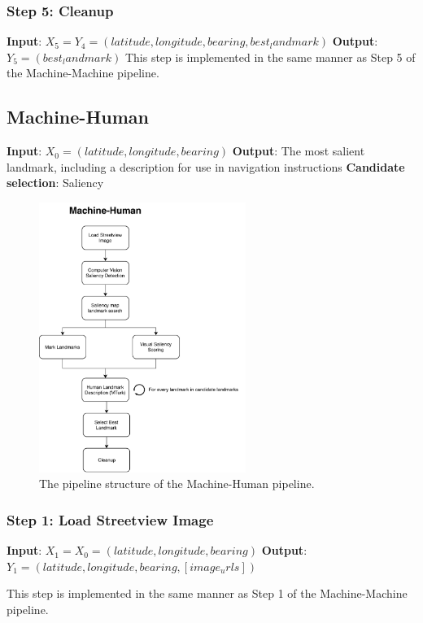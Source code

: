 \subsubsection*{Step 5: Cleanup}

\textbf{Input}: $X_5 = Y_4 = (latitude, longitude, bearing, best_landmark)$
\textbf{Output}: $Y_5 = (best_landmark)$
This step is implemented in the same manner as Step 5 of the Machine-Machine pipeline.

\subsection{Machine-Human}
\textbf{Input}: $X_0 = (latitude, longitude, bearing)$
\textbf{Output}: The most salient landmark, including a description for use in navigation instructions
\textbf{Candidate selection}: Saliency

\begin{figure}[htbp]
  \centering
  \includegraphics[width=0.6\textwidth]{pipeline_diagrams/machine-human.pdf}
  \caption{The pipeline structure of the Machine-Human pipeline.}
  \label{fig:pipeline:mh}
\end{figure}

\subsubsection*{Step 1: Load Streetview Image}
\textbf{Input}: $X_1 = X_0 = (latitude, longitude, bearing)$
\textbf{Output}: $Y_1 = (latitude, longitude, bearing, [image_urls])$

This step is implemented in the same manner as Step 1 of the Machine-Machine pipeline.


